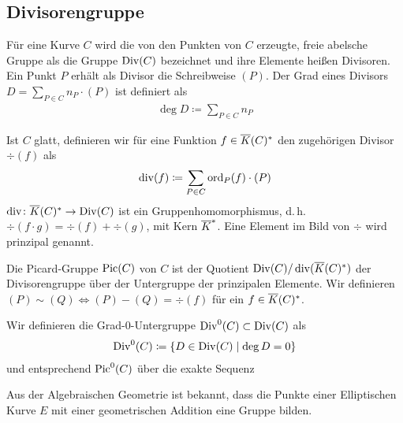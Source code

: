 
\subsection{Divisorengruppe}
\begin{Definition}[Divisorengruppe]
  Für eine Kurve $C$ wird die von den Punkten von $C$ erzeugte, freie
  abelsche Gruppe als die Gruppe $\operatorname{Div}(C)$ bezeichnet und ihre
  Elemente heißen Divisoren. Ein Punkt $P$ erhält als Divisor die
  Schreibweise $(P)$. 
  Der Grad eines Divisors $D=\sum_{P\in C}n_P\cdot(P)$ ist definiert als
  \begin{gather*}
    \deg D \coloneqq \sum_{P\in C} n_P
  \end{gather*}
  
  Ist $C$ glatt, definieren wir für eine Funktion
  $f\in\overline K(C)^*$ den zugehörigen Divisor $\div(f)$
  als
  \begin{gather*}
    \operatorname{div}(f) \coloneqq \sum_{P\in C}\operatorname{ord}_P(f)\cdot(P)
  \end{gather*}
  $\operatorname{div}\colon\overline K(C)^*\to\operatorname{Div}(C)$ ist ein Gruppenhomomorphismus,
  d.\,h. $\div(f\cdot g)=\div(f)+\div(g)$,
  mit Kern $\overline K^*$.
  Eine Element im Bild von $\div$ wird prinzipal genannt.
  
  Die Picard-Gruppe $\operatorname{Pic}(C)$ von $C$ ist der Quotient
  $\operatorname{Div}(C)/\operatorname{div}(\overline K(C)^*)$ der Divisorengruppe über der Untergruppe
  der prinzipalen Elemente. Wir definieren 
  $(P)\sim(Q)\Leftrightarrow (P)-(Q)=\div(f)$ für ein $f\in\overline K(C)^*$.

  Wir definieren die Grad-0-Untergruppe $\operatorname{Div}^0(C)\subset\operatorname{Div}(C)$ als
  \begin{gather*}
    \operatorname{Div}^0(C) \coloneqq \left\{ D\in\operatorname{Div}(C) \;\middle|\; \deg D=0 \right\}
  \end{gather*}
  und entsprechend $\operatorname{Pic}^0(C)$ über die exakte Sequenz
  \begin{center}
  \end{center}
\end{Definition}

Aus der Algebraischen Geometrie ist bekannt, dass die Punkte einer
Elliptischen Kurve $E$ mit einer geometrischen Addition eine Gruppe
bilden.

